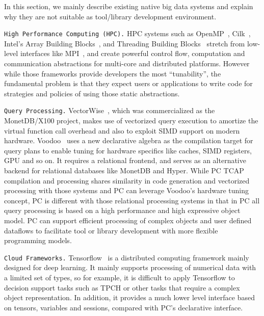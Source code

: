 In this section, we mainly describe existing native big
data systems and explain why they are not suitable as tool/library
development environment.

\vspace{5pt} 
\texttt{High Performance Computing (HPC).} HPC
systems such as OpenMP~\cite{dagum1998openmp}, Cilk~\cite{blumofe1996cilk},  Intel's Array Building
Blocks~\cite{newburn2011intel}, and Threading Building Blocks~\cite{reinders2007intel} stretch from
low-level interfaces like MPI~\cite{gropp1996high}, and create powerful control flow, computation
and communication abstractions for multi-core and distributed
platforms. However while those frameworks provide developers the most
``tunability'', the fundamental problem is that they expect users
or applications to write code for strategies and policies of using
those static abstractions. 

\vspace{5pt} 
\texttt{Query Processing.} VectorWise~\cite{zukowski2012vectorwise}, which was commercialized as the MonetDB/X100 project, makes use of
vectorized query execution to amortize the virtual function call overhead and also to exploit SIMD support
on modern hardware. Voodoo~\cite{pirk2016voodoo} uses a new
declarative algebra as the compilation target for query plans to
enable tuning for hardware specifics like caches, SIMD registers,
GPU and so on. It requires a relational frontend, and serves as an alternative backend for
relational databases like MonetDB and Hyper. While PC TCAP compilation
and processing shares
similarity in
code generation and vectorized processing with those
systems and PC can leverage Voodoo's hardware tuning concept, PC is
different with those relational processing systems in that in PC all query processing
is based on a high performance and high expressive object model.
PC can support efficient
processing of complex objects and user defined
dataflows to facilitate tool or library development with more flexible
programming models.

\vspace{5pt} 
\texttt{Cloud Frameworks.} Tensorflow~\cite{abadi2016tensorflow} is a
distributed computing framework mainly designed for deep learning. It
mainly supports processing of numerical data with a
limited set of types, so for example,  it is
difficult to apply Tensorflow to decision support tasks such as
TPCH or other tasks that require a complex object representation. In
addition, it provides a much lower level interface based on tensors,
variables and sessions, compared with PC's
declarative interface. 



